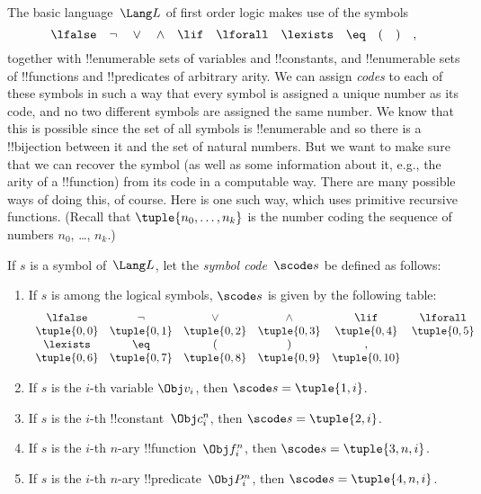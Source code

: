 \documentclass[../../../include/open-logic-section]{subfiles}
\begin{document}

The basic language~$\Lang L$ of first order logic makes use of the symbols
\[
\lfalse \quad \lnot \quad \lor \quad \land \quad \lif \quad \lforall
\quad \lexists \quad \eq \quad ( \quad ) \quad ,
\]
together with !!{enumerable} sets of variables and !!{constant}s, and
!!{enumerable} sets of !!{function}s and !!{predicate}s of arbitrary
arity.  We can assign \emph{codes} to each of these symbols in such a
way that every symbol is assigned a unique number as its code, and no
two different symbols are assigned the same number.  We know that this
is possible since the set of all symbols is !!{enumerable} and so
there is a !!{bijection} between it and the set of natural numbers.
But we want to make sure that we can recover the symbol (as well as
some information about it, e.g., the arity of a !!{function}) from its
code in a computable way.  There are many possible ways of doing this,
of course.  Here is one such way, which uses primitive recursive
functions.  (Recall that $\tuple{n_0, \dots, n_k}$ is the number
coding the sequence of numbers $n_0$, \dots, $n_k$.)

\begin{defn}
If $s$ is a symbol of~$\Lang L$, let the \emph{symbol code}~$\scode s$ be
defined as follows:
\begin{enumerate}
\item If $s$ is among the logical symbols, $\scode s$ is given by the
  following table:
\[
\begin{array}{cccccccccc}
  \lfalse & \lnot & \lor & \land & \lif & \lforall \\
\tuple{0, 0} & \tuple{0, 1} & \tuple{0, 2} & \tuple{0, 3} &
\tuple{0, 4} & \tuple{0, 5} \\
\lexists & \eq & ( & ) & ,\\
\tuple{0, 6} & \tuple{0, 7} &
\tuple{0, 8} & \tuple{0, 9} & \tuple{0, 10}
\end{array}
\]
\item If $s$ is the $i$-th variable $\Obj v_i$, then $\scode s = \tuple{1, i}$.
\item If $s$ is the $i$-th !!{constant}~$\Obj c_i^n$, then
  $\scode s = \tuple{2, i}$.
\item If $s$ is the $i$-th $n$-ary !!{function}~$\Obj f_i^n$, then
  $\scode s = \tuple{3, n, i}$.
\item If $s$ is the $i$-th $n$-ary !!{predicate}~$\Obj P_i^n$, then
  $\scode s = \tuple{4, n, i}$.
\end{enumerate}
\end{defn}
\end{document}
